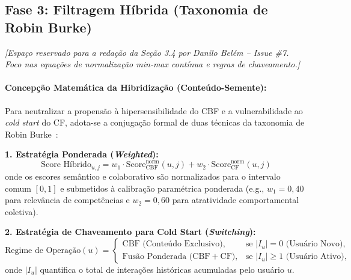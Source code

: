\subsection{Fase 3: Filtragem Híbrida (Taxonomia de Robin Burke)}
\label{sec:fase3_hibrido}

\noindent\textit{[Espaço reservado para a redação da Seção 3.4 por Danilo Belém -- Issue \#7. Foco nas equações de normalização min-max contínua e regras de chaveamento.]}

\paragraph{Concepção Matemática da Hibridização (Conteúdo-Semente):}
Para neutralizar a propensão à hipersensibilidade do CBF e a vulnerabilidade ao \textit{cold start} do CF, adota-se a conjugação formal de duas técnicas da taxonomia de Robin Burke~\cite{burke2002}:

\begin{tcolorbox}[burkebox, title={Concepção Matemática da Filtragem Híbrida}]
\textbf{1. Estratégia Ponderada (\textit{Weighted}):}
\begin{equation}
    \text{Score Híbrido}_{u,j} = w_1 \cdot \text{Score}_{\text{CBF}}^{\text{norm}}(u, j) + w_2 \cdot \text{Score}_{\text{CF}}^{\text{norm}}(u, j)
\end{equation}
onde os escores semântico e colaborativo são normalizados para o intervalo comum $[0, 1]$ e submetidos à calibração paramétrica ponderada (e.g., $w_1 = 0{,}40$ para relevância de competências e $w_2 = 0{,}60$ para atratividade comportamental coletiva).

\vspace{0.25cm}
\textbf{2. Estratégia de Chaveamento para Cold Start (\textit{Switching}):}
\begin{equation}
    \text{Regime de Operação}(u) = 
    \begin{cases} 
        \text{CBF (Conteúdo Exclusivo)}, & \text{se } |I_u| = 0 \text{ (Usuário Novo)}, \\
        \text{Fusão Ponderada (CBF} + \text{CF)}, & \text{se } |I_u| \ge 1 \text{ (Usuário Ativo)},
    \end{cases}
\end{equation}
onde $|I_u|$ quantifica o total de interações históricas acumuladas pelo usuário $u$.
\end{tcolorbox}
